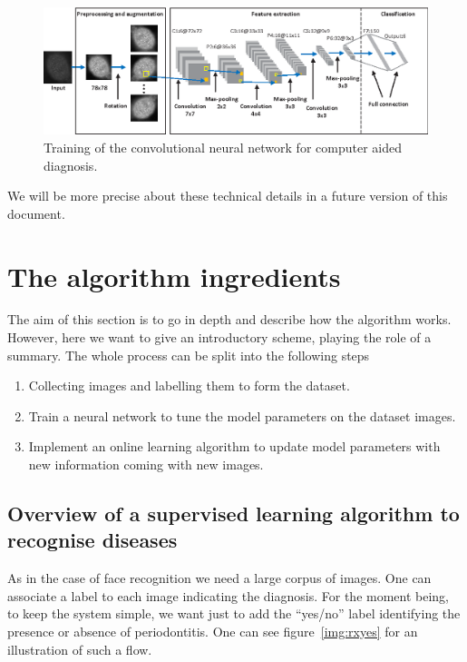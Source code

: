 \documentclass[a4paper, 10pt, superscriptaddress, nofootinbib, showkeys, notitlepage]{revtex4-1}
\begin{document}
		\begin{figure}[h]
  			\includegraphics[width=.7\linewidth]{Images/CNN.png}
 			\caption{Training of the convolutional neural network for computer aided diagnosis.}
 			\label{fig:cad-cnn}
		\end{figure}
	We will be more precise about these technical details in a future version of this document.
%	
\section{The algorithm ingredients}
	The aim of this section is to go in depth and describe how the algorithm works.
	However, here we want to give an introductory scheme, playing the role of a summary.
	The whole process can be split into the following steps
		\begin{enumerate}
			\item Collecting images and labelling them to form the dataset.
			\item Train a neural network to tune the model parameters on the dataset images.
			\item Implement an online learning algorithm to update model parameters with new information coming with new images.
		\end{enumerate}
	
\subsection{Overview of a supervised learning algorithm to recognise diseases}
	As in the case of face recognition we need a large corpus of images. 
	One can associate a label to each image indicating the diagnosis.
	For the moment being, to keep the system simple, we want just to add the ``yes/no'' label identifying the presence or absence of periodontitis.
	One can see figure~\ref{img:rxyes} for an illustration of such a flow.
	
\end{document}
